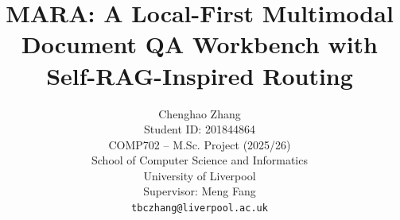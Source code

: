\documentclass[11pt]{article}
\author{
Chenghao Zhang \\
Student ID: 201844864 \\
COMP702 -- M.Sc. Project (2025/26) \\
School of Computer Science and Informatics \\
University of Liverpool \\
Supervisor: Meng Fang \\
\texttt{tbczhang@liverpool.ac.uk}
}
\title{MARA: A Local-First Multimodal Document QA Workbench with Self-RAG-Inspired Routing}
\begin{document}
\maketitle



\raggedbottom


\appendix

\end{document}
